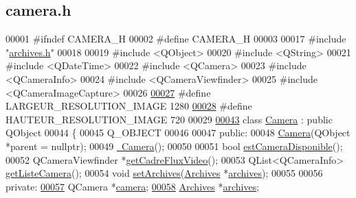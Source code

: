 \hypertarget{camera_8h_source}{}\subsection{camera.\+h}

\begin{DoxyCode}
00001 \textcolor{preprocessor}{#ifndef CAMERA\_H}
00002 \textcolor{preprocessor}{#define CAMERA\_H}
00003 
00017 \textcolor{preprocessor}{#include "\hyperlink{archives_8h}{archives.h}"}
00018 
00019 \textcolor{preprocessor}{#include <QObject>}
00020 \textcolor{preprocessor}{#include <QString>}
00021 \textcolor{preprocessor}{#include <QDateTime>}
00022 \textcolor{preprocessor}{#include <QCamera>}
00023 \textcolor{preprocessor}{#include <QCameraInfo>}
00024 \textcolor{preprocessor}{#include <QCameraViewfinder>}
00025 \textcolor{preprocessor}{#include <QCameraImageCapture>}
00026 
\hyperlink{camera_8h_a1cdfce9d11c96526aaac6717f3ba10fc}{00027} \textcolor{preprocessor}{#define LARGEUR\_RESOLUTION\_IMAGE 1280}
\hyperlink{camera_8h_ab6598f2bd4db8451b2077f23274656a4}{00028} \textcolor{preprocessor}{#define HAUTEUR\_RESOLUTION\_IMAGE 720}
00029 
\hyperlink{class_camera}{00043} \textcolor{keyword}{class }\hyperlink{class_camera}{Camera} : \textcolor{keyword}{public} QObject
00044 \{
00045     Q\_OBJECT
00046 
00047 \textcolor{keyword}{public}:
00048     \hyperlink{class_camera_ae3aa4afd7a3d9ddc2bf710bc74dc293e}{Camera}(QObject *parent = \textcolor{keyword}{nullptr});
00049     \hyperlink{class_camera_ad1897942d0ccf91052386388a497349f}{~Camera}();
00050 
00051     \textcolor{keywordtype}{bool} \hyperlink{class_camera_afb73ab859802a143a1a00443e396143e}{estCameraDisponible}();
00052     QCameraViewfinder *\hyperlink{class_camera_a67420d3ef14065a412327ada6193a2e0}{getCadreFluxVideo}();
00053     QList<QCameraInfo> \hyperlink{class_camera_ad8a2a21d3701375a553c7c90646c694f}{getListeCamera}();
00054     \textcolor{keywordtype}{void} \hyperlink{class_camera_a66b844eec2b721a6ac23b80cb3fe2426}{setArchives}(\hyperlink{class_archives}{Archives} *\hyperlink{class_camera_a5eb3a29aeeab2f2755d0b69ac7cf550a}{archives});
00055 
00056 \textcolor{keyword}{private}:
\hyperlink{class_camera_a282a199ddd33fe64bc27b32a55719054}{00057}     QCamera *\hyperlink{class_camera_a282a199ddd33fe64bc27b32a55719054}{camera}; 
\hyperlink{class_camera_a5eb3a29aeeab2f2755d0b69ac7cf550a}{00058}     \hyperlink{class_archives}{Archives} *\hyperlink{class_camera_a5eb3a29aeeab2f2755d0b69ac7cf550a}{archives}; 

\end{DoxyCode}
